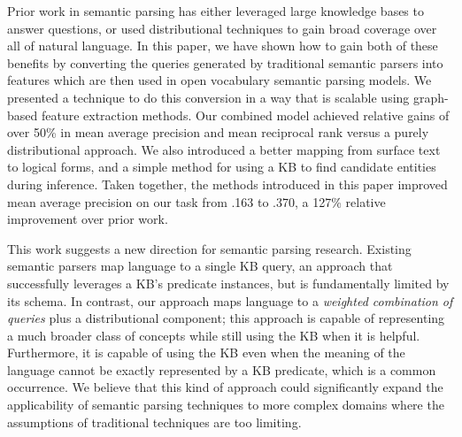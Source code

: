 \documentclass[11pt,letterpaper]{article}
\begin{document}
Prior work in semantic parsing has either leveraged large knowledge bases to answer questions, or
used distributional techniques to gain broad coverage over all of natural language.  In this paper,
we have shown how to gain both of these benefits by converting the queries generated by traditional
semantic parsers into features which are then used in open vocabulary semantic parsing models.  We
presented a technique to do this conversion in a way that is scalable using graph-based feature
extraction methods.  Our combined model achieved relative gains of over 50\% in mean average
precision and mean reciprocal rank versus a purely distributional approach.  We also introduced a
better mapping from surface text to logical forms, and a simple method for using a KB to find
candidate entities during inference.  Taken together, the methods introduced in this paper improved
mean average precision on our task from .163 to .370, a 127\% relative improvement over prior work.

This work suggests a new direction for semantic parsing research.  Existing semantic parsers map
language to a single KB query, an approach that successfully leverages a KB's predicate instances,
but is fundamentally limited by its schema. In contrast, our approach maps language to a
\emph{weighted combination of queries} plus a distributional component; this approach is capable of
representing a much broader class of concepts while still using the KB when it is helpful.
Furthermore, it is capable of using the KB even when the meaning of the language cannot be exactly
represented by a KB predicate, which is a common occurrence. We believe that this kind of approach
could significantly expand the applicability of semantic parsing techniques to more complex domains
where the assumptions of traditional techniques are too limiting.




\end{document}

